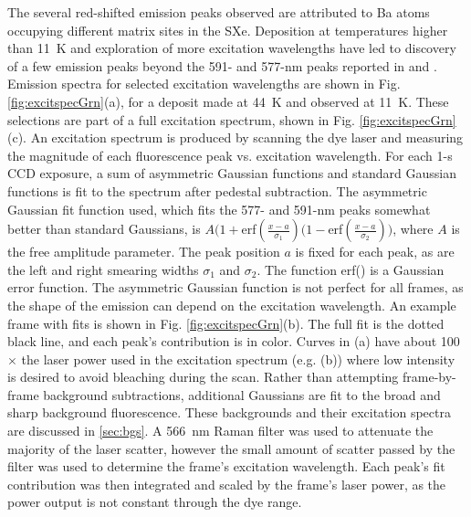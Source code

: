 
The several red-shifted emission peaks observed are attributed to Ba atoms occupying different matrix sites in the SXe.  Deposition at temperatures higher than 11~K and exploration of more excitation wavelengths have led to discovery of a few emission peaks beyond the 591- and 577-nm peaks reported in \cite{Shon} and \cite{Brian}.  Emission spectra for selected excitation wavelengths are shown in Fig. \ref{fig:excitspecGrn}(a), for a deposit made at 44~K and observed at 11~K.  These selections are part of a full excitation spectrum, shown in Fig. \ref{fig:excitspecGrn}(c).  An excitation spectrum is produced by scanning the dye laser and measuring the magnitude of each fluorescence peak vs. excitation wavelength.  For each 1-s CCD exposure, a sum of asymmetric Gaussian functions and standard Gaussian functions is fit to the spectrum after pedestal subtraction.  The asymmetric Gaussian fit function used, which fits the 577- and 591-nm peaks somewhat better than standard Gaussians, is $A(1+$erf$(\frac{x-a}{\sigma_{1}})(1-$erf$(\frac{x-a}{\sigma_{2}}))$, where $A$ is the free amplitude parameter.  The peak position $a$ is fixed for each peak, as are the left and right smearing widths $\sigma_{1}$ and $\sigma_{2}$.  The function erf() is a Gaussian error function.  The asymmetric Gaussian function is not perfect for all frames, as the shape of the emission can depend on the excitation wavelength.  An example frame with fits is shown in Fig. \ref{fig:excitspecGrn}(b).  The full fit is the dotted black line, and each peak's contribution is in color.  Curves in (a) have about 100$\times$ the laser power used in the excitation spectrum (e.g. (b)) where low intensity is desired to avoid bleaching during the scan.  Rather than attempting frame-by-frame background subtractions, additional Gaussians are fit to the broad and sharp background fluorescence.  These backgrounds and their excitation spectra are discussed in \ref{sec:bgs}.  A 566~nm Raman filter was used to attenuate the majority of the laser scatter, however the small amount of scatter passed by the filter was used to determine the frame's excitation wavelength.  Each peak's fit contribution was then integrated and scaled by the frame's laser power, as the power output is not constant through the dye range.



